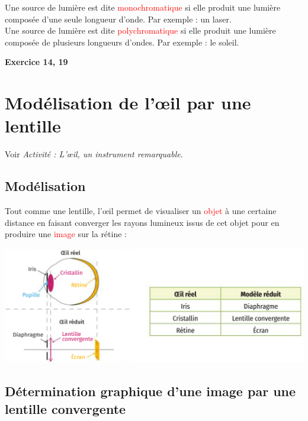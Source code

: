 \begin{tcolorbox}[colback=green!5!white,colframe=green!75!black,title=\textbf{Source monochromatique ou polychromatique:}]
Une source de lumière est dite \textcolor{red}{monochromatique} si elle produit une lumière composée d'une seule longueur d'onde. Par exemple : un laser.\\

Une source de lumière est dite \textcolor{red}{polychromatique} si elle produit une lumière composée de plusieurs longueurs d'ondes. Par exemple : le soleil.
\end{tcolorbox}

\begin{Large}
\end{Large}\textbf{Exercice 14, 19}
\section{Modélisation de l'\oe il par une lentille}
\begin{Large}
\end{Large}
Voir \textit{Activité : L'\oe il, un instrument remarquable}.

\subsection{Modélisation}
Tout comme une lentille, l'\oe il permet de visualiser un \textcolor{red}{objet} à une certaine distance en faisant converger les rayons lumineux issus de cet objet pour en produire une \textcolor{red}{image} sur la rétine :
\begin{center}
    \includegraphics[scale=0.5]{Images/Modele_oeil.PNG}
\end{center}

\subsection{Détermination graphique d'une image par une lentille convergente}

